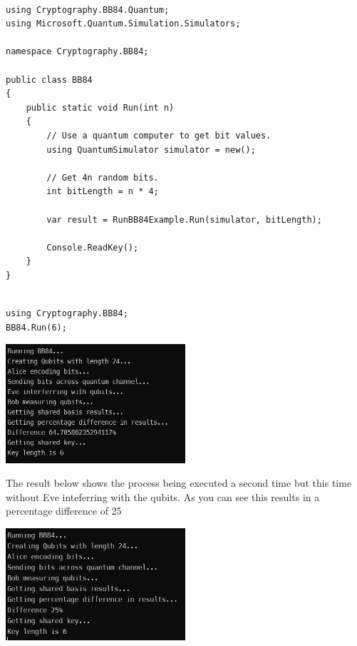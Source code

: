 \documentclass{article}
\begin{document}
\begin{lstlisting}[language={[Sharp]C}, caption={C\# Driver code sets the number of qubits to 4n}, label={Script}]

using Cryptography.BB84.Quantum;
using Microsoft.Quantum.Simulation.Simulators;

namespace Cryptography.BB84;

public class BB84
{
    public static void Run(int n)
    {
        // Use a quantum computer to get bit values.
        using QuantumSimulator simulator = new();

        // Get 4n random bits.
        int bitLength = n * 4;

        var result = RunBB84Example.Run(simulator, bitLength);

        Console.ReadKey();
    }
}

\end{lstlisting}

\begin{lstlisting}[language={[Sharp]C}, caption={C\# Driver code sets the key length to 6}, label={Script}]

using Cryptography.BB84;
BB84.Run(6);

\end{lstlisting}

\includegraphics[width=0.5\textwidth]{BB84Output.jpg}

\vspace{5mm}

The result below shows the process being executed a second time but this time without Eve inteferring with the qubits. As you can see this results in a percentage difference of 25%

\vspace{5mm}

\includegraphics[width=0.5\textwidth]{BB84Output2.jpg}
\end{document}
